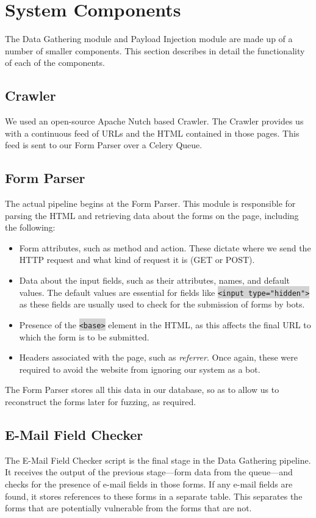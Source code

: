 \section{System Components}
\label{Comp}

The Data Gathering module and Payload Injection module are made up of a number of smaller components. This section describes in detail the functionality of each of the components.

\subsection{Crawler}
\label{Comp:Crawler}
We used an open-source Apache Nutch based Crawler. The Crawler provides us with a continuous feed of URLs and the HTML contained in those pages. This feed is sent to our Form Parser over a Celery Queue.

\subsection{Form Parser}
\label{Comp:FP}
The actual pipeline begins at the Form Parser. This module is responsible for parsing the HTML and retrieving data about the forms on the page, including the following:
\begin{itemize}
	\item Form attributes, such as method and action. These dictate where we send the HTTP request and what kind of request it is (GET or POST).
	\item Data about the input fields, such as their attributes, names, and default values. The default values are essential for fields like \colorbox{lightgray}{\lstinline{<input type="hidden">}} as these fields are usually used to check for the submission of forms by bots.
	\item Presence of the \colorbox{lightgray}{\lstinline{<base>}} element in the HTML, as this affects the final URL to which the form is to be submitted.
	\item Headers associated with the page, such as \emph{referrer}. Once again, these were required to avoid the website from ignoring our system as a bot.
\end{itemize} 
The Form Parser stores all this data in our database, so as to allow us to reconstruct the forms later for fuzzing, as required.

\subsection{E-Mail Field Checker}
\label{Comp:EMFC}
The E-Mail Field Checker script is the final stage in the Data Gathering pipeline. It receives the output of the previous stage---form data from the queue---and checks for the presence of e-mail fields in those forms. If any e-mail fields are found, it stores references to these forms in a separate table. This separates the forms that are potentially vulnerable from the forms that are not.

